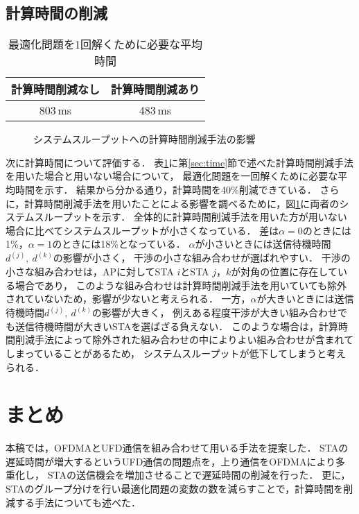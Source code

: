 \documentclass[technicalreport]{ieicej}
\begin{document}
	\subsection{計算時間の削減}
		\begin{table}[t]
			\centering
			\caption{最適化問題を1回解くために必要な平均時間}
			\label{tab:time}
			\begin{tabular}{cc}
			 計算時間削減なし & 計算時間削減あり\\ \hline
			 803\,ms & 483\,ms \\\hline
			\end{tabular}
		\end{table}
		\begin{figure}[t]
			\centering
			\caption{システムスループットへの計算時間削減手法の影響}
			\label{fig:thr_time}
		\end{figure}

	次に計算時間について評価する．
	表\ref{tab:time}に第\ref{sec:time}節で述べた計算時間削減手法を用いた場合と用いない場合について，
	最適化問題を一回解くために必要な平均時間を示す．
	結果から分かる通り，計算時間を40\%削減できている．
	さらに，計算時間削減手法を用いたことによる影響を調べるために，図\ref{fig:thr_time}に両者のシステムスループットを示す．
	全体的に計算時間削減手法を用いた方が用いない場合に比べてシステムスループットが小さくなっている．
	差は$\alpha=0$のときには1\%，$\alpha=1$のときには18\%となっている．
	$\alpha$が小さいときには送信待機時間$d^{(j)},\ d^{(k)}$の影響が小さく，
	干渉の小さな組み合わせが選ばれやすい．
	干渉の小さな組み合わせは，APに対してSTA $i$とSTA $j$，$k$が対角の位置に存在している場合であり，
	このような組み合わせは計算時間削減手法を用いていても除外されていないため，影響が少ないと考えられる．
	一方，$\alpha$が大きいときには送信待機時間$d^{(j)},\ d^{(k)}$の影響が大きく，
	例えある程度干渉が大きい組み合わせでも送信待機時間が大きいSTAを選ばざる負えない．
	このような場合は，計算時間削減手法によって除外された組み合わせの中によりよい組み合わせが含まれてしまっていることがあるため，
	システムスループットが低下してしまうと考えられる．

\section{まとめ}
	本稿では，OFDMAとUFD通信を組み合わせて用いる手法を提案した．
	STAの遅延時間が増大するというUFD通信の問題点を，上り通信をOFDMAにより多重化し，
	STAの送信機会を増加させることで遅延時間の削減を行った．
	更に，STAのグループ分けを行い最適化問題の変数の数を減らすことで，計算時間を削減する手法についても述べた．



\end{document}
